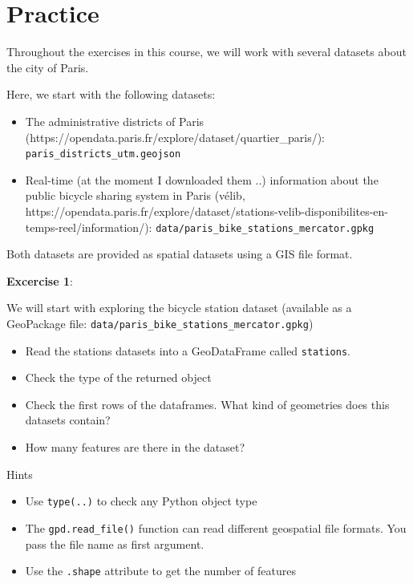 \documentclass[
  letterpaper,
  DIV=11,
  numbers=noendperiod]{scrreprt}
\providecommand{\tightlist}{%
  \setlength{\itemsep}{0pt}\setlength{\parskip}{0pt}}\usepackage{longtable,booktabs,array}
\begin{document}

\chapter{Practice}\label{practice}

Throughout the exercises in this course, we will work with several
datasets about the city of Paris.

Here, we start with the following datasets:

\begin{itemize}
\tightlist
\item
  The administrative districts of Paris
  (https://opendata.paris.fr/explore/dataset/quartier\_paris/):
  \texttt{paris\_districts\_utm.geojson}
\item
  Real-time (at the moment I downloaded them ..) information about the
  public bicycle sharing system in Paris (vélib,
  https://opendata.paris.fr/explore/dataset/stations-velib-disponibilites-en-temps-reel/information/):
  \texttt{data/paris\_bike\_stations\_mercator.gpkg}
\end{itemize}

Both datasets are provided as spatial datasets using a GIS file format.

\textbf{Excercise 1}:

We will start with exploring the bicycle station dataset (available as a
GeoPackage file: \texttt{data/paris\_bike\_stations\_mercator.gpkg})

\begin{itemize}
\tightlist
\item
  Read the stations datasets into a GeoDataFrame called
  \texttt{stations}.
\item
  Check the type of the returned object
\item
  Check the first rows of the dataframes. What kind of geometries does
  this datasets contain?
\item
  How many features are there in the dataset?
\end{itemize}

Hints

\begin{itemize}
\tightlist
\item
  Use \texttt{type(..)} to check any Python object type
\item
  The \texttt{gpd.read\_file()} function can read different geospatial
  file formats. You pass the file name as first argument.
\item
  Use the \texttt{.shape} attribute to get the number of features
\end{itemize}
\end{document}
